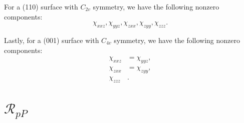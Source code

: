 For a (110) surface with $C_{2v}$ symmetry, we have the following nonzero
components: 
\begin{equation}\label{eq:nonzero110}
\chi_{xxz}, \chi_{yyz}, \chi_{zxx}, \chi_{zyy}, \chi_{zzz}.
\end{equation}

Lastly, for a (001) surface with $C_{4v}$ symmetry, we have the following
nonzero components:
\begin{equation}\label{eq:nonzero001}
\begin{split}
\chi_{xxz}&=\chi_{yyz},\\
\chi_{zxx}&=\chi_{zyy},\\
\chi_{zzz}&.
\end{split}
\end{equation}



\section{\texorpdfstring{$\mathcal{R}_{pP}$}{RpP}}

